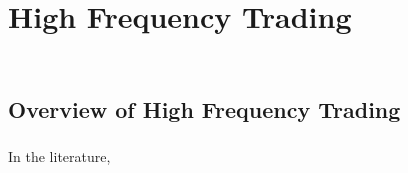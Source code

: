 
\chapter{High Frequency Trading} %

\label{chapter:high_frequency_trading} %
$\frac{}{}$
	

\section{Overview of High Frequency Trading}

\subsection{}
In the literature, 

